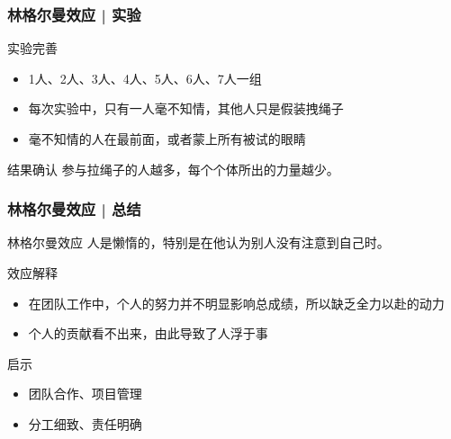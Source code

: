 \begin{frame}
  \frametitle{林格尔曼效应 | 实验}
  \begin{block}{实验完善}
    \begin{itemize}
      \item 1人、2人、3人、4人、5人、6人、7人一组
      \item 每次实验中，只有一人毫不知情，其他人只是假装拽绳子
      \item 毫不知情的人在最前面，或者蒙上所有被试的眼睛
    \end{itemize}
  \end{block}
  \pause
  \begin{block}{结果确认}
    参与拉绳子的人越多，每个个体所出的力量越少。
  \end{block}
\end{frame}

\begin{frame}
  \frametitle{林格尔曼效应 | 总结}
  \begin{block}{林格尔曼效应}
    人是懒惰的，特别是在他认为别人没有注意到自己时。
  \end{block}
  \pause
  \begin{block}{效应解释}
    \begin{itemize}
      \item 在团队工作中，个人的努力并不明显影响总成绩，所以缺乏全力以赴的动力
      \item 个人的贡献看不出来，由此导致了人浮于事
    \end{itemize}
  \end{block}
  \pause
  \begin{block}{启示}
    \begin{itemize}
      \item 团队合作、项目管理
      \item 分工细致、责任明确
    \end{itemize}
  \end{block}
\end{frame}

